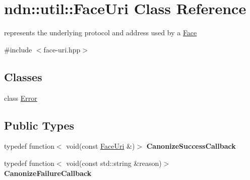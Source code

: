 \hypertarget{classndn_1_1util_1_1FaceUri}{}\section{ndn\+:\+:util\+:\+:Face\+Uri Class Reference}
\label{classndn_1_1util_1_1FaceUri}


represents the underlying protocol and address used by a \hyperlink{classndn_1_1Face}{Face}  




{\ttfamily \#include $<$face-\/uri.\+hpp$>$}

\subsection*{Classes}
\begin{DoxyCompactItemize}
\item 
class \hyperlink{classndn_1_1util_1_1FaceUri_1_1Error}{Error}
\end{DoxyCompactItemize}
\subsection*{Public Types}
\begin{DoxyCompactItemize}
\item 
typedef function$<$ void(const \hyperlink{classndn_1_1util_1_1FaceUri}{Face\+Uri} \&)$>$ {\bfseries Canonize\+Success\+Callback}\hypertarget{classndn_1_1util_1_1FaceUri_a6d70b92314383d1ebfbaf2665e3edd64}{}\label{classndn_1_1util_1_1FaceUri_a6d70b92314383d1ebfbaf2665e3edd64}

\item 
typedef function$<$ void(const std\+::string \&reason)$>$ {\bfseries Canonize\+Failure\+Callback}\hypertarget{classndn_1_1util_1_1FaceUri_ab3ec8b041a2eeb9e0b804cdc176b1fa6}{}\label{classndn_1_1util_1_1FaceUri_ab3ec8b041a2eeb9e0b804cdc176b1fa6}

\end{DoxyCompactItemize}
